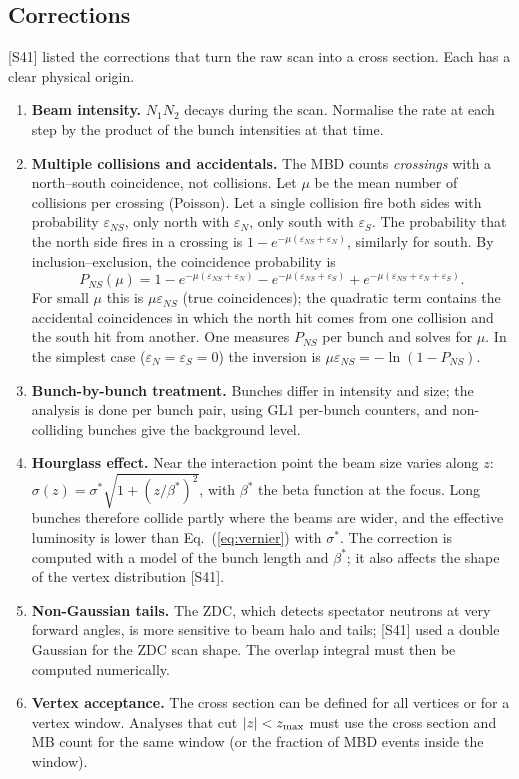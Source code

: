 \documentclass[11pt,letterpaper]{article}
\begin{document}
\subsection{Corrections}
[S41] listed the corrections that turn the raw scan into a cross section. Each has a clear physical origin.
\begin{enumerate}
\item \textbf{Beam intensity.} $N_1N_2$ decays during the scan. Normalise the rate at each step by the product of the bunch
intensities at that time.
\item \textbf{Multiple collisions and accidentals.} The MBD counts \emph{crossings} with a north--south coincidence, not collisions.
Let $\mu$ be the mean number of collisions per crossing (Poisson). Let a single collision fire both sides with probability
$\varepsilon_{NS}$, only north with $\varepsilon_N$, only south with $\varepsilon_S$. The probability that the north side fires in a
crossing is $1-e^{-\mu(\varepsilon_{NS}+\varepsilon_N)}$, similarly for south. By inclusion--exclusion, the coincidence probability is
\begin{equation}
P_{NS}(\mu) = 1 - e^{-\mu(\varepsilon_{NS}+\varepsilon_N)} - e^{-\mu(\varepsilon_{NS}+\varepsilon_S)} + e^{-\mu(\varepsilon_{NS}+\varepsilon_N+\varepsilon_S)} .
\end{equation}
For small $\mu$ this is $\mu\varepsilon_{NS}$ (true coincidences); the quadratic term contains the accidental coincidences in which
the north hit comes from one collision and the south hit from another. One measures $P_{NS}$ per bunch and solves for $\mu$. In the
simplest case ($\varepsilon_N=\varepsilon_S=0$) the inversion is $\mu\varepsilon_{NS} = -\ln(1-P_{NS})$.
\item \textbf{Bunch-by-bunch treatment.} Bunches differ in intensity and size; the analysis is done per bunch pair, using
GL1 per-bunch counters, and non-colliding bunches give the background level.
\item \textbf{Hourglass effect.} Near the interaction point the beam size varies along $z$: $\sigma(z)=\sigma^*\sqrt{1+(z/\beta^*)^2}$,
with $\beta^*$ the beta function at the focus. Long bunches therefore collide partly where the beams are wider, and the effective
luminosity is lower than Eq.~(\ref{eq:vernier}) with $\sigma^*$. The correction is computed with a model of the bunch length and
$\beta^*$; it also affects the shape of the vertex distribution [S41].
\item \textbf{Non-Gaussian tails.} The ZDC, which detects spectator neutrons at very forward angles, is more sensitive to beam halo
and tails; [S41] used a double Gaussian for the ZDC scan shape. The overlap integral must then be computed numerically.
\item \textbf{Vertex acceptance.} The cross section can be defined for all vertices or for a vertex window. Analyses that cut
$|z|<z_{\rm max}$ must use the cross section and MB count for the same window (or the fraction of MBD events inside the window).
\end{enumerate}
\end{document}
